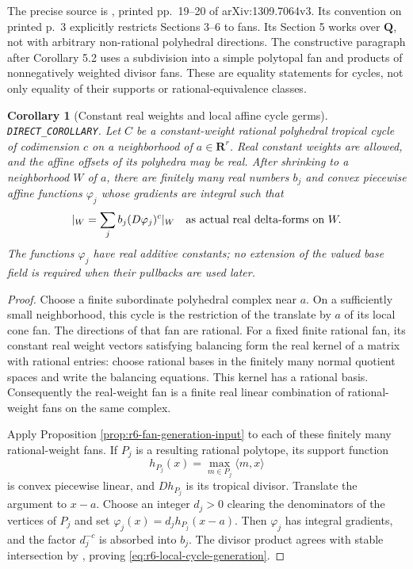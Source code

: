 \documentclass[11pt,a4paper]{article}
\numberwithin{equation}{section}
\newtheorem{corollary}[theorem]{Corollary}
\theoremstyle{definition}
\theoremstyle{remark}
\begin{document}
The precise source is \cite[Theorem 5.1 and Corollary 5.2]{JY16},
printed pp.~19--20 of arXiv:1309.7064v3.  Its convention on printed p.~3
explicitly restricts Sections 3--6 to fans.  Its Section 5 works over
$\mathbf Q$, not with arbitrary non-rational polyhedral directions.
The constructive paragraph after Corollary 5.2 uses a subdivision into
a simple polytopal fan and products of nonnegatively weighted divisor
fans.  These are equality statements for cycles, not only equality of
their supports or rational-equivalence classes.

\begin{corollary}[Constant real weights and local affine cycle germs]
\label{cor:r6-local-constant-cycle-generation}
\textnormal{\texttt{DIRECT\_COROLLARY}.}
Let $C$ be a constant-weight rational polyhedral tropical cycle of
codimension $c$ on a neighborhood of $a\in\mathbf R^r$.  Real constant
weights are allowed, and the affine offsets of its polyhedra may be
real.  After shrinking to a neighborhood $W$ of $a$, there are finitely
many real numbers $b_j$ and convex piecewise affine functions $\varphi_j$
whose gradients are integral such that
\begin{equation}
              [C]|_W=\sum_j b_j(D\varphi_j)^c|_W
              \quad\hbox{as actual real delta-forms on }W.
 \label{eq:r6-local-cycle-generation}
\end{equation}
The functions $\varphi_j$ have real additive constants; no extension of
the valued base field is required when their pullbacks are used later.
\end{corollary}

\begin{proof}
Choose a finite subordinate polyhedral complex near $a$.  On a
sufficiently small neighborhood, this cycle is the restriction of the
translate by $a$ of its local cone fan.  The directions of that fan
are rational.  For a fixed finite rational fan, its constant real
weight vectors satisfying balancing form the real kernel of a
matrix with rational entries: choose rational bases in the finitely
many normal quotient spaces and write the balancing equations.
This kernel has a rational basis.  Consequently the real-weight
fan is a finite real linear combination of rational-weight fans
on the same complex.

Apply Proposition \ref{prop:r6-fan-generation-input} to each of these
finitely many rational-weight fans.  If $P_j$ is a resulting rational
polytope, its support function
\[
                    h_{P_j}(x)=\max_{m\in P_j}\langle m,x\rangle
\]
is convex piecewise linear, and $Dh_{P_j}$ is its tropical divisor.
Translate the argument to $x-a$.  Choose an integer $d_j>0$ clearing
the denominators of the vertices of $P_j$ and set
$\varphi_j(x)=d_jh_{P_j}(x-a)$.  Then $\varphi_j$ has integral
gradients, and the factor $d_j^{-c}$ is absorbed into $b_j$.
The divisor product agrees with stable intersection by
\cite[Theorem 4.1(4)]{Mih23}, proving \eqref{eq:r6-local-cycle-generation}.
\end{proof}
\end{document}
